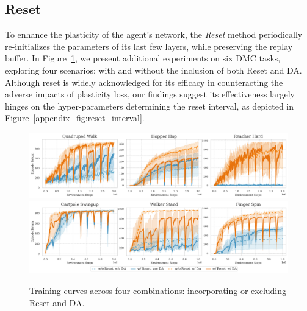 \subsection{Reset}
\label{Appendix: Reset}
To enhance the plasticity of the agent's network, the \textit{Reset} method periodically re-initializes the parameters of its last few layers, while preserving the replay buffer. In Figure~\ref{appendix_fig:reset}, we present additional experiments on six DMC tasks, exploring four scenarios: with and without the inclusion of both Reset and DA. Although reset is widely acknowledged for its efficacy in counteracting the adverse impacts of plasticity loss, our findings suggest its effectiveness largely hinges on the hyper-parameters determining the reset interval, as depicted in Figure~\ref{appendix_fig:reset_interval}.
\begin{figure}[ht]
  \centering
  \vspace{-\baselineskip}
  \includegraphics[width=\textwidth]{Figures/5Appendix/reset_DA.pdf}
  \includegraphics[width=\textwidth]{Figures/5Appendix/reset_DA_1M.pdf}
  \vspace{-2\baselineskip}
  \caption{Training curves across four combinations: incorporating or excluding Reset and DA.}
  \label{appendix_fig:reset}
\end{figure}

